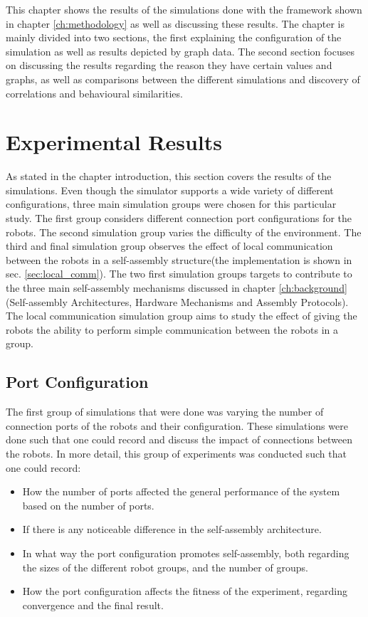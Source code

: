 This chapter shows the results of the simulations done with the framework shown in chapter \ref{ch:methodology} as well as discussing these results.
The chapter is mainly divided into two sections, the first explaining the configuration of the simulation as well as results depicted by graph data.
The second section focuses on discussing the results regarding the reason they have certain values and graphs, as well as comparisons between the different simulations and discovery of correlations and behavioural similarities.

\section{Experimental Results}
As stated in the chapter introduction, this section covers the results of the simulations. 
Even though the simulator supports a wide variety of different configurations, three main simulation groups were chosen for this particular study.
The first group considers different connection port configurations for the robots.
The second simulation group varies the difficulty of the environment.
The third and final simulation group observes the effect of local communication between the robots in a self-assembly structure(the implementation is shown in sec. \ref{sec:local_comm}).
The two first simulation groups targets to contribute to the three main self-assembly mechanisms discussed in chapter \ref{ch:background}(Self-assembly Architectures, Hardware Mechanisms and Assembly Protocols).
The local communication simulation group aims to study the effect of giving the robots the ability to perform simple communication between the robots in a group.

\subsection{Port Configuration}
The first group of simulations that were done was varying the number of connection ports of the robots and their configuration.
These simulations were done such that one could record and discuss the impact of connections between the robots.
In more detail, this group of experiments was conducted such that one could record:

\begin{itemize}
	\item How the number of ports affected the general performance of the system based on the number of ports.
	\item If there is any noticeable difference in the self-assembly architecture.
	\item In what way the port configuration promotes self-assembly, both regarding the sizes of the different robot groups, and the number of groups.
	\item How the port configuration affects the fitness of the experiment, regarding convergence and the final result.
\end{itemize}

